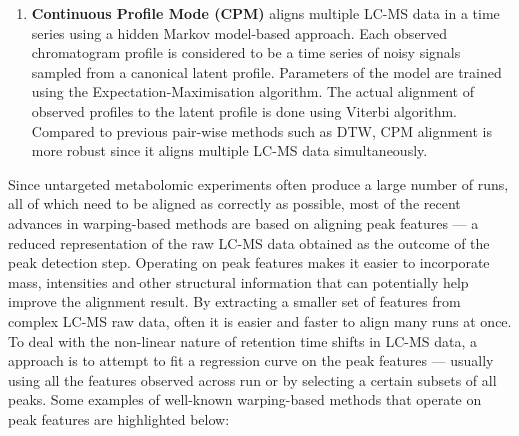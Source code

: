 \begin{enumerate}
\item \textbf{Continuous Profile Mode (CPM)} \cite{Listgarten2005} aligns multiple LC-MS data in a time series using a hidden Markov model-based approach. Each observed chromatogram profile is considered to be a time series of noisy signals sampled from a canonical latent profile. Parameters of the model are trained using the Expectation-Maximisation algorithm. The actual alignment of observed profiles to the latent profile is done using Viterbi algorithm. Compared to previous pair-wise methods such as DTW, CPM alignment is more robust since it aligns multiple LC-MS data simultaneously. 
\end{enumerate}

Since untargeted metabolomic experiments often produce a large number of runs, all of which need to be aligned as correctly as possible, most of the recent advances in warping-based methods are based on aligning peak features --- a reduced representation of the raw LC-MS data obtained as the outcome of the peak detection step. Operating on peak features makes it easier to incorporate mass, intensities and other structural information that can potentially help improve the alignment result. By extracting a smaller set of features from complex LC-MS raw data, often it is easier and faster to align many runs at once. To deal with the non-linear nature of retention time shifts in LC-MS data, a approach is to attempt to fit a regression curve on the peak features --- usually using all the features observed across run or by selecting a certain subsets of all peaks. Some examples of well-known warping-based methods that operate on peak features are highlighted below: 


